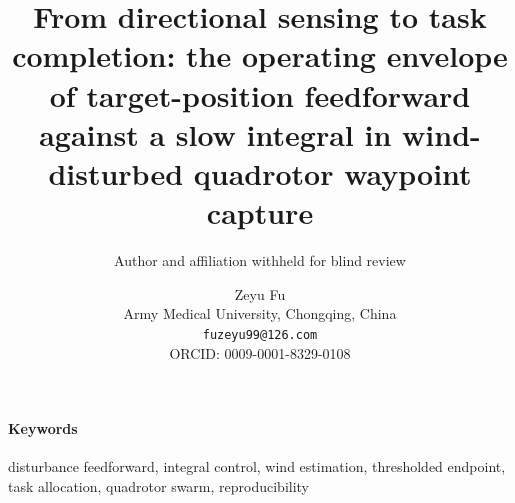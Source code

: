 \documentclass[11pt]{article}
\title{From directional sensing to task completion: the operating envelope of
target-position feedforward against a slow integral in wind-disturbed quadrotor
waypoint capture}
\author{Author and affiliation withheld for blind review}
\author{Zeyu Fu\\
Army Medical University, Chongqing, China\\
\texttt{fuzeyu99@126.com}\\
ORCID: 0009-0001-8329-0108}
\date{}
\numberwithin{equation}{section}
\begin{document}
\maketitle

\begin{abstract}

\end{abstract}

\paragraph{Keywords} disturbance feedforward, integral control, wind estimation, thresholded endpoint, task allocation, quadrotor swarm, reproducibility



{\footnotesize


}
\end{document}
